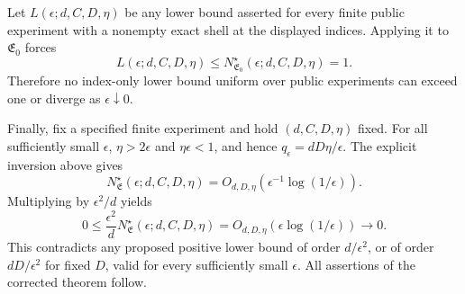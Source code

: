 Let \(L(\epsilon;d,C,D,\eta)\) be any lower bound asserted for every finite public experiment with a nonempty exact shell at the displayed indices. Applying it to \(\mathfrak E_0\) forces
\[
L(\epsilon;d,C,D,\eta)
\le N^\star_{\mathfrak E_0}(\epsilon;d,C,D,\eta)=1.
\]
Therefore no index-only lower bound uniform over public experiments can exceed one or diverge as \(\epsilon\downarrow0\).

Finally, fix a specified finite experiment and hold \((d,C,D,\eta)\) fixed. For all sufficiently small \(\epsilon\), \(\eta>2\epsilon\) and \(\eta\epsilon<1\), and hence \(q_\epsilon=dD\eta/\epsilon\). The explicit inversion above gives
\[
N^\star_{\mathfrak E}(\epsilon;d,C,D,\eta)
=O_{d,D,\eta}\!\left(\epsilon^{-1}\log(1/\epsilon)\right).
\]
Multiplying by \(\epsilon^2/d\) yields
\[
0\le\frac{\epsilon^2}{d}N^\star_{\mathfrak E}(\epsilon;d,C,D,\eta)
=O_{d,D,\eta}\!\left(\epsilon\log(1/\epsilon)\right)
\longrightarrow0.
\]
This contradicts any proposed positive lower bound of order \(d/\epsilon^2\), or of order \(dD/\epsilon^2\) for fixed \(D\), valid for every sufficiently small \(\epsilon\). All assertions of the corrected theorem follow.